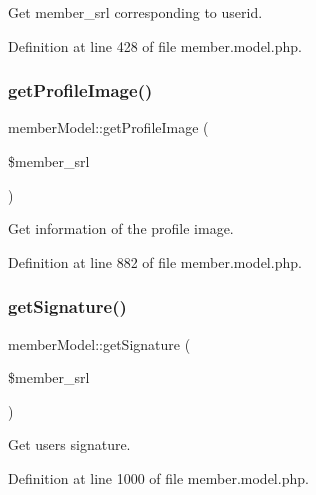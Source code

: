 Get member\+\_\+srl corresponding to userid. 



Definition at line 428 of file member.\+model.\+php.

\mbox{\label{classmemberModel_af5bd1dffc3b3a613ecbb549ef1c980ac}} 
\subsubsection{\texorpdfstring{get\+Profile\+Image()}{getProfileImage()}}
{\footnotesize\ttfamily member\+Model\+::get\+Profile\+Image (\begin{DoxyParamCaption}\item[{}]{\$member\+\_\+srl }\end{DoxyParamCaption})}



Get information of the profile image. 



Definition at line 882 of file member.\+model.\+php.

\mbox{\label{classmemberModel_a188af39a0460de37242d2df2651dc6e5}} 
\subsubsection{\texorpdfstring{get\+Signature()}{getSignature()}}
{\footnotesize\ttfamily member\+Model\+::get\+Signature (\begin{DoxyParamCaption}\item[{}]{\$member\+\_\+srl }\end{DoxyParamCaption})}



Get user\textquotesingle{}s signature. 



Definition at line 1000 of file member.\+model.\+php.

\mbox{\label{classmemberModel_ab249b6e54c0b7d472d3cd50ad3b658dc}} 
